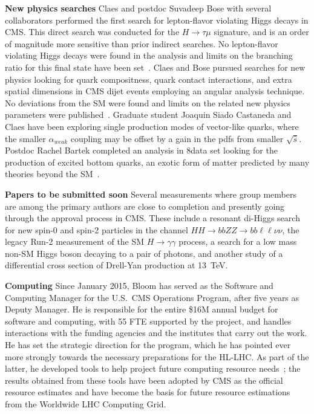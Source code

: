 {\bf New physics searches}
Claes and postdoc Suvadeep Bose with several collaborators performed the first search for lepton-flavor violating Higgs decays in CMS. This direct search was conducted for the $H\rightarrow \tau\mu$ signature, and is an order of magnitude more sensitive than prior indirect searches. No lepton-flavor violating Higgs decays were found in the analysis and limits on the branching ratio for this final state have been set~\cite{bib:higgs-LFV}.
%
Claes and Bose pursued searches for new physics looking for quark compositness, quark contact interactions, and extra spatial dimensions in CMS dijet events employing an angular analysis technique. No deviations from the SM were found and limits on the related new physics parameters were published~\cite{bib:quark-compositness-etc}.
%
Graduate student Joaquin Siado Castaneda and Claes have been exploring single production modes of vector-like quarks, where the smaller $\alpha_{weak}$ coupling may be offset by a gain in the pdfs from smaller $\sqrt{\hat{s}}$.
%
Postdoc Rachel Bartek completed an analysis in 8\TeV data set looking for the production of excited bottom quarks, an exotic form of matter predicted by many theories beyond the SM~\cite{bib:bstar}. 

{\bf Papers to be submitted soon} Several measurements where group members are among the primary authors are close to completion and presently going through the approval process in CMS. These include a resonant di-Higgs search for new spin-0 and spin-2 particles in the channel $HH\to bbZZ\to bb\ell\ell\nu\nu$, the legacy Run-2 measurement of the SM $H\to\gamma\gamma$ process, a search for a low mass non-SM Higgs boson decaying to a pair of photons, and another study of a differential cross section of Drell-Yan production at 13~TeV. 

{\bf Computing} Since January 2015, Bloom has served as the Software and
Computing Manager for the U.S.~CMS Operations Program, after
five years as Deputy Manager.  He is responsible for the entire \$16M
annual budget for software and computing, with 55 FTE
supported by the project, and handles interactions with the funding
agencies and the institutes that carry out the work.  He
has set the strategic direction for the program, which he has pointed ever
more strongly towards the necessary preparations for the HL-LHC.  As part
of the latter, he developed tools to help project future computing resource
needs~\cite{bib:resource-modeling}; the results obtained from these tools
have been adopted by CMS as the official resource estimates and have
become the basis for future resource estimations from the Worldwide LHC
Computing Grid.

